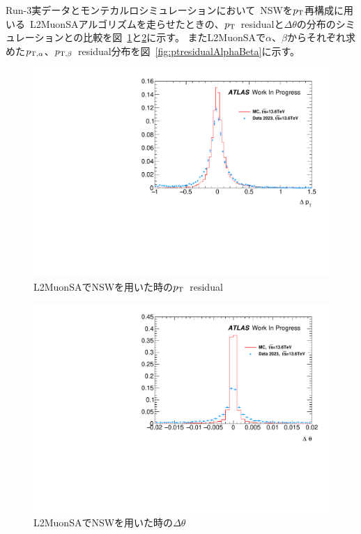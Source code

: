Run-3実データとモンテカルロシミュレーションにおいて~NSWを$p_\mathrm{T}$再構成に用いる~L2MuonSAアルゴリズムを走らせたときの、$p_\mathrm{T}$~residualと$\Delta\theta$の分布のシミュレーションとの比較を図~\ref{fig:ptresidualDataMC}と\ref{fig:deltaThetaDataMC}に示す。
またL2MuonSAで$\alpha$、$\beta$からそれぞれ求めた$p_{\rm{T, \alpha}}$、$p_{\rm{T, \beta}}$~residual分布を図~\ref{fig:ptresidualAlphaBeta}に示す。

\begin{figure}[H]
    \centering
    \includegraphics[clip, width=12cm]{fig/5/ptresidual_NSW.pdf}
    \caption{L2MuonSAでNSWを用いた時の$p_\mathrm{T}$~residual}
    \label{fig:ptresidualDataMC}
\end{figure}

\begin{figure}[H]
    \centering
    \includegraphics[clip, width=12cm]{fig/5/deltaTheta_NSW.pdf}
    \caption{L2MuonSAでNSWを用いた時の$\Delta \theta$}
    \label{fig:deltaThetaDataMC}
\end{figure}

